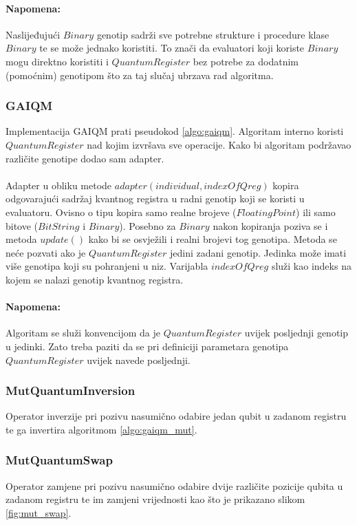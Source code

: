 \documentclass[times, utf8, zavrsni, numeric]{fer}
\begin{document}
\paragraph{Napomena:}
Naslijeđujući $Binary$ genotip sadrži sve potrebne strukture i procedure klase $Binary$ te se može jednako koristiti. To znači da evaluatori koji koriste $Binary$ mogu direktno koristiti i $QuantumRegister$ bez potrebe za dodatnim (pomoćnim) genotipom što za taj slučaj ubrzava rad algoritma.

\subsubsection{GAIQM}
Implementacija GAIQM prati pseudokod \ref{algo:gaiqm}. Algoritam interno koristi $QuantumRegister$ nad kojim izvršava sve operacije. Kako bi algoritam podržavao različite genotipe dodao sam adapter.

\paragraph{}
Adapter u obliku metode $adapter(individual, indexOfQreg)$ kopira odgovarajući sadržaj kvantnog registra u radni genotip koji se koristi u evaluatoru. Ovisno o tipu kopira samo realne brojeve ($FloatingPoint$) ili samo bitove ($BitString$ i $Binary$). Posebno za $Binary$ nakon kopiranja poziva se i metoda $update()$ kako bi se osvježili i realni brojevi tog genotipa. Metoda se neće pozvati ako je $QuantumRegister$ jedini zadani genotip. Jedinka može imati više genotipa koji su pohranjeni u niz. Varijabla $indexOfQreg$ služi kao indeks na kojem se nalazi genotip kvantnog registra. 

\paragraph{Napomena:}
Algoritam se služi konvencijom da je $QuantumRegister$ uvijek posljednji genotip u jedinki. Zato treba paziti da se pri definiciji parametara genotipa $QuantumRegister$ uvijek navede posljednji.

\subsubsection{MutQuantumInversion}
Operator inverzije pri pozivu nasumično odabire jedan qubit u zadanom registru te ga invertira algoritmom \ref{algo:gaiqm_mut}.

\subsubsection{MutQuantumSwap}
Operator zamjene pri pozivu nasumično odabire dvije različite pozicije qubita u zadanom registru te im zamjeni vrijednosti kao što je prikazano slikom \ref{fig:mut_swap}.
\end{document}
